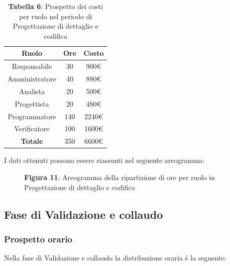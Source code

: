 \begin{table}[H]
	\centering
	\renewcommand{\arraystretch}{1.5}
	\begin{tabular}{|c|c|c|}
		\hline
		\rowcolor{lighter-grayer}
Ruolo & Ore & Costo \\ \hline
Responsabile & 30 & 900\euro \\ \hline
Amministratore & 40 & 880\euro \\ \hline
Analista & 20 & 500\euro \\ \hline
Progettista & 20 & 480\euro \\ \hline
Programmatore & 140 & 2240\euro \\ \hline
Verificatore & 100 & 1600\euro \\ \hline
\textbf{Totale} & 350 & 6600\euro \\ \hline
	\end{tabular}
	\caption*{\textbf{Tabella 6}: Prospetto dei costi per ruolo nel periodo di Progettazione di dettaglio e codifica\\}
\end{table}

I dati ottenuti possono essere riassunti nel seguente areogramma:


\begin{figure}[H]
	\centering
	\caption*{\textbf{Figura 11}: Areogramma della ripartizione di ore per ruolo in Progettazione di dettaglio e codifica}
	\label{fig:Figura10}
\end{figure}

\subsection{Fase di Validazione e collaudo}
\subsubsection{Prospetto orario}
Nella fase di Validazione e collaudo la distribuzione oraria è la seguente:

